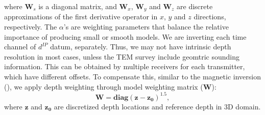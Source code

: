\documentclass[a4paper, 11pt]{article}
\newcommand{\dip}{d^{IP}}
\begin{document}
where $\mathbf{W}_s$ is a diagonal matrix, and $\mathbf{W}_x$, $\mathbf{W}_y$ and $\mathbf{W}_z$ are discrete approximations of the first derivative operator in $x$, $y$ and $z$ directions, respectively.  
The $\alpha$'s are weighting parameters that balance the relative importance of producing small or smooth models.
We are inverting each time channel of $\dip$ datum, separately. Thus, we may not have intrinsic depth resolution in most cases, unless the TEM survey include geomtric sounding information. This can be obtained by multiple receivers for each transmitter, which have different offsets.   
To compensate this, similar to the magnetic inversion (\cite{LiMag3D}), we apply depth weighting through model weighting matrix ($\mathbf{W}$):
\begin{equation}
    \mathbf{W} = \mathbf{diag}(\mathbf{z-z_0})^{1.5},
    \label{eq: weight_mat}
\end{equation}
where $\mathbf{z}$ and $\mathbf{z_0}$ are discretized depth locations and reference depth in 3D domain.

\end{document}
